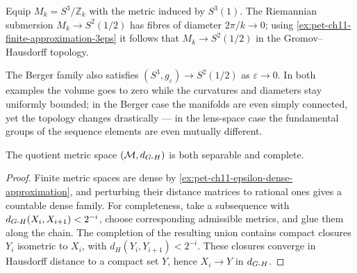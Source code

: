 \begin{example}
  \label{ex:pet-ch11-lens-spaces-limit}

  Equip $M_k=S^3/\mathbb{Z}_k$ with the metric induced by $S^3(1)$. The
  Riemannian submersion $M_k\to S^2(1/2)$ has fibres of diameter
  $2\pi/k\to0$; using \cref{ex:pet-ch11-finite-approximation-3eps} it follows
  that $M_k\to S^2(1/2)$ in the Gromov--Hausdorff topology.
\end{example}

\begin{example}
  \label{ex:pet-ch11-berger-spheres-limit}

  The Berger family also satisfies $(S^3,g_\varepsilon)\to S^2(1/2)$ as
  $\varepsilon\to0$. In both examples the volume goes to zero while the
  curvatures and diameters stay uniformly bounded; in the Berger case the
  manifolds are even simply connected, yet the topology changes drastically —
  in the lens-space case the fundamental groups of the sequence elements are
  even mutually different.
\end{example}

\begin{proposition}
  \label{prop:pet-ch11-gh-space-separable-complete}

  The quotient metric space $(\mathcal{M},d_{G\text{-}H})$ is both separable and
  complete.
\end{proposition}
\begin{proof}
  \sketch
  Finite metric spaces are dense by
  \cref{ex:pet-ch11-epsilon-dense-approximation}, and perturbing their
  distance matrices to rational ones gives a countable dense family. For completeness, take a subsequence with
  \(d_{G\text{-}H}(X_i,X_{i+1})<2^{-i}\), choose corresponding admissible metrics, and glue them along the chain. The completion of the resulting union contains compact closures \(Y_i\) isometric to \(X_i\), with \(d_H(Y_i,Y_{i+1})<2^{-i}\). These closures converge in Hausdorff distance to a compact set \(Y\), hence \(X_i\to Y\) in \(d_{G\text{-}H}\).
\end{proof}


